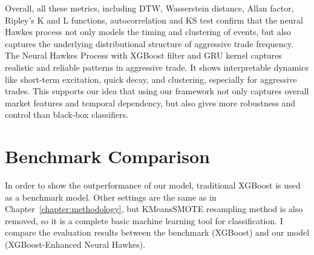 

Overall, all these metrics, including DTW, Wasserstein distance, Allan factor, Ripley's K and L functions, autocorrelation and KS test confirm that the neural Hawkes process not only models the timing and clustering of events, but also captures the underlying distributional structure of aggressive trade frequency. The Neural Hawkes Process with XGBoost filter and GRU kernel captures realistic and reliable patterns in aggressive trade. It shows interpretable dynamics like short-term excitation, quick decay, and clustering, especially for aggressive trades. This supports our idea that using our framework not only captures overall market features and temporal dependency, but also gives more robustness and control than black-box classifiers.


\newpage

\section{Benchmark Comparison} \label{sec:benchmark}
In order to show the outperformance of our model, traditional XGBoost is used as a benchmark model. Other settings are the same as in Chapter~\ref{chapter:methodology}, but KMeansSMOTE resampling method is also removed, so it is a complete basic machine learning tool for classification. I compare the evaluation results between the benchmark (XGBoost) and our model (XGBoost-Enhanced Neural Hawkes). 


